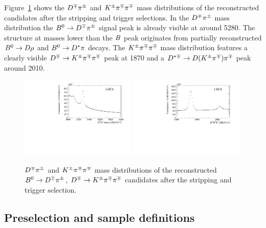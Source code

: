 Figure~\ref{fig:mB_mD_after_stripping} shows the $D^\mp\pi^\pm$ and $K^{\pm}\pi^\mp\pi^\mp$ mass
distributions of the reconstructed candidates after the stripping and trigger
selections. In the $D^\mp\pi^\pm$ mass distribution the $B^0\rightarrow D^\mp\pi^\pm$ signal peak is already visible at
around \SI{5280}{\MeVcc}. The structure at masses lower than the $B$ peak originates from
partially reconstructed $B^0\rightarrow D\rho$ and $B^0\rightarrow D^*\pi$ decays. The $K^{\pm}\pi^\mp\pi^\mp$
mass distribution features a clearly visible $D^\mp\rightarrow K^{\pm}\pi^\mp\pi^\mp$ peak at \SI{1870}{\MeVcc} and
a $D^{*\mp}\rightarrow D(K^\pm\pi^\mp)\pi^\mp$ peak around \SI{2010}{\MeVcc}.
%
\begin{figure}[t]
	\begin{center}
		\includegraphics[width=0.49\textwidth]{02Selection/figs/Bmass_afterStrippingAndTrigger.pdf}
		\includegraphics[width=0.49\textwidth]{02Selection/figs/Dmass_afterStrippingAndTrigger.pdf}
	\end{center}
        \vspace{-2mm}
	\caption{$D^\mp\pi^\pm$ and $K^{\pm}\pi^\mp\pi^\mp$ mass distributions of the reconstructed $B^0\rightarrow D^\mp\pi^\pm$, $D^\mp\rightarrow K^{\pm}\pi^\mp\pi^\mp$ candidates
	after the stripping and trigger selection.}
	\label{fig:mB_mD_after_stripping}
\end{figure}

\subsection{Preselection and sample definitions}
\label{sec:preselection}

